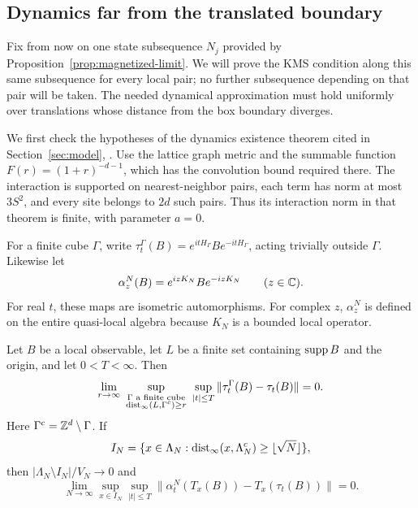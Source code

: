 \subsection{Dynamics far from the translated boundary}\label{subsec:deep-dynamics}

Fix from now on one state subsequence \(N_j\) provided by
Proposition~\ref{prop:magnetized-limit}.  We will prove the KMS
condition along this same subsequence for every local pair; no further
subsequence depending on that pair will be taken.  The needed
dynamical approximation must hold uniformly over translations whose
distance from the box boundary diverges.

We first check the hypotheses of the dynamics existence theorem cited in
Section~\ref{sec:model}, \cite[Theorem~2.2]{NachtergaeleOgataSims2006}.
Use the lattice graph metric and the summable function
$F(r)=(1+r)^{-d-1}$, which has the convolution bound required there.
The interaction is supported on nearest-neighbor pairs, each term has
norm at most $3S^2$, and every site belongs to $2d$ such pairs.
Thus its interaction norm in that theorem is finite, with parameter
$a=0$.

For a finite cube \(\Gamma\), write
\(\tau_t^\Gamma(B)=e^{itH_\Gamma}Be^{-itH_\Gamma}\), acting trivially
outside \(\Gamma\).  Likewise let
\[
 \alpha_z^N(B)=e^{izK_N}Be^{-izK_N}\qquad(z\in\mathbb C).
\]
For real \(t\), these maps are isometric automorphisms.  For complex
\(z\), \(\alpha_z^N\) is defined on the entire quasi-local algebra
because \(K_N\) is a bounded local operator.

\begin{lemma}\label{lem:deep-dynamics}
Let \(B\) be a local observable, let \(L\) be a finite set containing
\(\operatorname{supp} B\) and the origin, and let \(0<T<\infty\).  Then
\begin{equation}\label{eq:deep-box-zero-field}
 \lim_{r\to\infty}\ 
 \sup_{\substack{\Gamma\text{ a finite cube}\\
                 \dist_\infty(L,\Gamma^c)\geq r}}
 \ \sup_{|t|\leq T}\|\tau_t^\Gamma(B)-\tau_t(B)\|=0.
\end{equation}
Here \(\Gamma^c=\mathbb Z^d\setminus\Gamma\).  If
\[
 I_N=\{x\in\Lambda_N:
       \operatorname{dist}_\infty(x,\Lambda_N^c)\geq\lfloor\sqrt N\rfloor\},
\]
then \(|\Lambda_N\setminus I_N|/V_N\to0\) and
\begin{equation}\label{eq:deep-box-with-field}
 \lim_{N\to\infty}\sup_{x\in I_N}\sup_{|t|\leq T}
 \|\alpha_t^N(T_x(B))-T_x(\tau_t(B))\|=0.
\end{equation}
\end{lemma}

